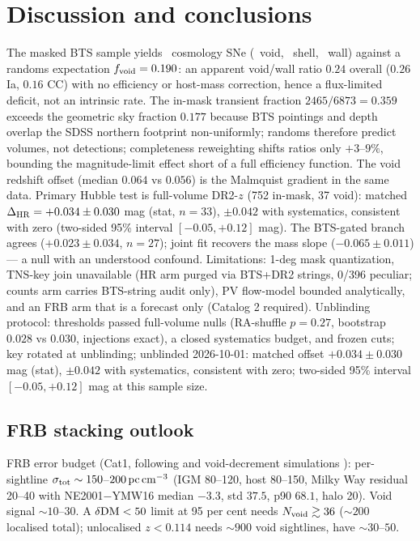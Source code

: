 \section{Discussion and conclusions}
The masked BTS sample yields \NCosmo\ cosmology SNe (\NVoidCosmo\ void, \NShellCosmo\ shell, \NWallCosmo\ wall) against a randoms expectation $f_{\rm void}=0.190$: an apparent void/wall ratio $0.24$ overall ($0.26$ Ia, $0.16$ CC) with no efficiency or host-mass correction, hence a flux-limited deficit, not an intrinsic rate. The in-mask transient fraction $2465/6873=0.359$ exceeds the geometric sky fraction $0.177$ because BTS pointings and depth overlap the SDSS northern footprint non-uniformly; randoms therefore predict volumes, not detections; completeness reweighting shifts ratios only $+3$--$9\%$, bounding the magnitude-limit effect short of a full efficiency function. The void redshift offset (median $0.064$ vs $0.056$) is the Malmquist gradient in the same data. Primary Hubble test is full-volume DR2-$z$ (752 in-mask, 37 void): matched $\Delta_{\rm HR}=+0.034\pm0.030$ mag (stat, $n=33$), $\pm0.042$ with systematics, consistent with zero (two-sided 95\% interval $[-0.05,+0.12]$ mag). The BTS-gated branch agrees ($+0.023\pm0.034$, $n=27$); joint fit recovers the mass slope ($-0.065\pm0.011$) — a null with an understood confound. Limitations: 1-deg mask quantization, TNS-key join unavailable (HR arm purged via BTS+DR2 strings, 0/396 peculiar; counts arm carries BTS-string audit only), PV flow-model bounded analytically, and an FRB arm that is a forecast only (Catalog 2 required). Unblinding protocol: thresholds passed full-volume nulls (RA-shuffle $p=0.27$, bootstrap $0.028$ vs $0.030$, injections exact), a closed systematics budget, and frozen cuts; key rotated at unblinding; unblinded 2026-10-01: matched offset $+0.034\pm0.030$ mag (stat), $\pm0.042$ with systematics, consistent with zero; two-sided 95\% interval $[-0.05,+0.12]$ mag at this sample size.

\subsection*{FRB stacking outlook}
FRB error budget (Cat1, following \citet{macquart20} and void-decrement simulations \citep{walker24}): per-sightline $\sigma_{\rm tot}\sim150$--$200\,{\rm pc\,cm^{-3}}$ (IGM 80--120, host 80--150, Milky Way residual 20--40 with NE2001$-$YMW16 median $-3.3$, std $37.5$, p90 $68.1$, halo 20). Void signal $\sim10$--$30$. A $\delta{\rm DM}<50$ limit at 95 per cent needs $N_{\rm void}\gtrsim36$ ($\sim200$ localised total); unlocalised $z<0.114$ needs $\sim900$ void sightlines, have $\sim30$--$50$.
